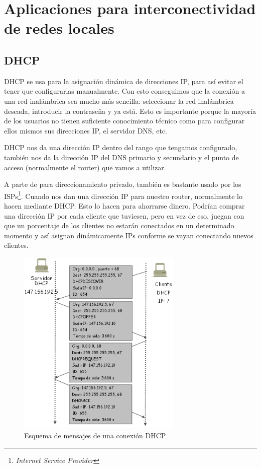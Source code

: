 \documentclass[10pt,a4paper,spanish]{report}
\begin{document}
\section{\textcolor{tema2}Aplicaciones para interconectividad de redes locales}
\subsection{\textcolor{tema2}DHCP}
DHCP se usa para la asignación dinámica de direcciones IP, para así evitar el tener que configurarlas manualmente. Con esto conseguimos que la conexión a una red inalámbrica sea mucho más sencilla: seleccionar la red inalámbrica deseada, introducir la contraseña y ya está. Esto es importante porque la mayoría de los usuarios no tienen suficiente conocimiento técnico como para configurar ellos mismos sus direcciones IP, el servidor DNS, etc.

DHCP nos da una dirección IP dentro del rango que tengamos configurado, también nos da la dirección IP del DNS primario y secundario y el punto de acceso (normalmente el router) que vamos a utilizar.

A parte de para direccionamiento privado, también es bastante usado por los ISPs\footnote{\textit{Internet Service Provider}}. Cuando nos dan una dirección IP para nuestro router, normalmente lo hacen mediante DHCP. Esto lo hacen para ahorrarse dinero. Podrían comprar una dirección IP por cada cliente que tuviesen, pero en vez de eso, juegan con que un porcentaje de los clientes no estarán conectados en un determinado momento y así asignan dinámicamente IPs conforme se vayan conectando nuevos clientes.

\begin{figure}[!h]
  \centering
  \includegraphics[width=0.7\textwidth]{tema2_12}
  \caption{Esquema de mensajes de una conexión DHCP}
  \label{dhcpmensajes}
\end{figure}
\end{document}
